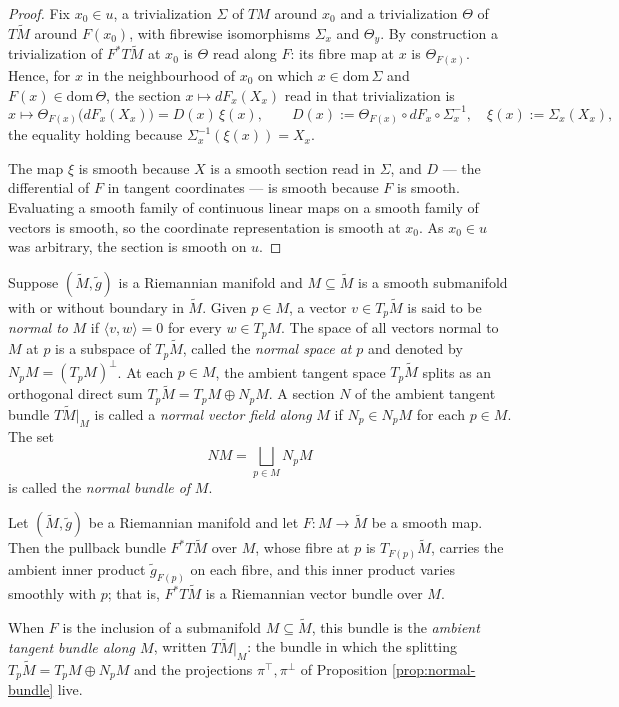 \begin{proof}
\leanok
Fix $x_0 \in u$, a trivialization $\Sigma$ of $TM$ around $x_0$ and a trivialization $\Theta$ of $T\tilde{M}$ around $F(x_0)$, with fibrewise isomorphisms $\Sigma_x$ and $\Theta_y$. By construction a trivialization of $F^* T\tilde M$ at $x_0$ is $\Theta$ read along $F$: its fibre map at $x$ is $\Theta_{F(x)}$. Hence, for $x$ in the neighbourhood of $x_0$ on which $x \in \mathrm{dom}\,\Sigma$ and $F(x) \in \mathrm{dom}\,\Theta$, the section $x \mapsto dF_x(X_x)$ read in that trivialization is
\[
x \longmapsto \Theta_{F(x)}\big(dF_x(X_x)\big) = D(x)\,\xi(x), \qquad
D(x) := \Theta_{F(x)} \circ dF_x \circ \Sigma_x^{-1}, \quad \xi(x) := \Sigma_x(X_x),
\]
the equality holding because $\Sigma_x^{-1}(\xi(x)) = X_x$.

The map $\xi$ is smooth because $X$ is a smooth section read in $\Sigma$, and $D$ — the differential of $F$ in tangent coordinates — is smooth because $F$ is smooth. Evaluating a smooth family of continuous linear maps on a smooth family of vectors is smooth, so the coordinate representation is smooth at $x_0$. As $x_0 \in u$ was arbitrary, the section is smooth on $u$.
\end{proof}

Suppose $(\tilde{M}, \tilde{g})$ is a Riemannian manifold and $M \subseteq \tilde{M}$ is a smooth submanifold with or without boundary in $\tilde{M}$. Given $p \in M$, a vector $v \in T_p \tilde M$ is said to be \textit{normal to} $M$ if $\langle v,w\rangle = 0$ for every $w \in T_p M$. The space of all vectors normal to $M$ at $p$ is a subspace of $T_p \tilde{M}$, called the \textit{normal space at} $p$ and denoted by $N_p M = (T_p M)^\perp$. At each $p \in M$, the ambient tangent space $T_p \tilde{M}$ splits as an orthogonal direct sum $T_p \tilde{M} = T_p M \oplus N_p M$. A section $N$ of the ambient tangent bundle $T\tilde{M}|_M$ is called a \textit{normal vector field along} $M$ if $N_p \in N_p M$ for each $p \in M$. The set
\[
NM = \bigsqcup_{p \in M} N_p M
\]
is called the \textit{normal bundle of} $M$.

\begin{lemma}
\label{lem:ambient-tangent-bundle-riemannian}
\leanok
{}
Let $(\tilde M, \tilde g)$ be a Riemannian manifold and let $F : M \to \tilde M$ be a smooth map. Then the pullback bundle $F^* T\tilde M$ over $M$, whose fibre at $p$ is $T_{F(p)}\tilde M$, carries the ambient inner product $\tilde g_{F(p)}$ on each fibre, and this inner product varies smoothly with $p$; that is, $F^* T\tilde M$ is a Riemannian vector bundle over $M$.

When $F$ is the inclusion of a submanifold $M \subseteq \tilde M$, this bundle is the \emph{ambient tangent bundle along $M$}, written $T\tilde M|_M$: the bundle in which the splitting $T_p\tilde M = T_p M \oplus N_p M$ and the projections $\pi^\top, \pi^\perp$ of Proposition \ref{prop:normal-bundle} live.
\end{lemma}

